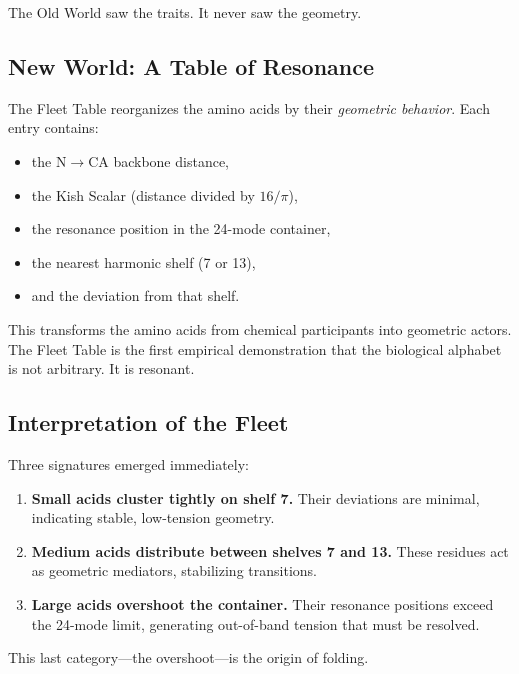 \documentclass[11pt, letterpaper, openany]{book}
\begin{document}
The Old World saw the traits.  
It never saw the geometry.

\subsection*{New World: A Table of Resonance}

The Fleet Table reorganizes the amino acids by their \textit{geometric
behavior}. Each entry contains:

\begin{itemize}
    \item the N$\rightarrow$CA backbone distance,
    \item the Kish Scalar (distance divided by $16/\pi$),
    \item the resonance position in the 24-mode container,
    \item the nearest harmonic shelf (7 or 13),
    \item and the deviation from that shelf.
\end{itemize}

This transforms the amino acids from chemical participants into geometric
actors. The Fleet Table is the first empirical demonstration that the biological
alphabet is not arbitrary. It is resonant.

\subsection*{Interpretation of the Fleet}

Three signatures emerged immediately:

\begin{enumerate}
    \item \textbf{Small acids cluster tightly on shelf 7.}  
    Their deviations are minimal, indicating stable, low-tension geometry.

    \item \textbf{Medium acids distribute between shelves 7 and 13.}  
    These residues act as geometric mediators, stabilizing transitions.

    \item \textbf{Large acids overshoot the container.}  
    Their resonance positions exceed the 24-mode limit, generating
    out-of-band tension that must be resolved.
\end{enumerate}

This last category---the overshoot---is the origin of folding.

\end{document}
